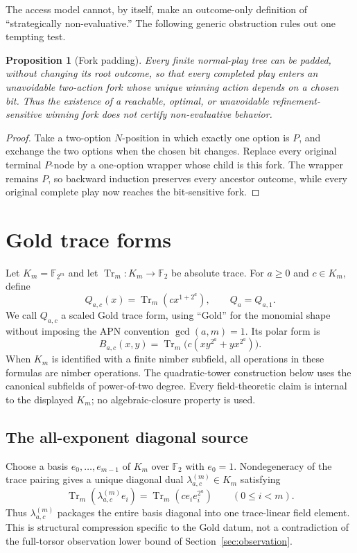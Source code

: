 \documentclass[11pt]{article}
\newtheorem{proposition}[theorem]{Proposition}
\theoremstyle{definition}
\theoremstyle{remark}
\newcommand{\F}{\mathbb{F}}
\newcommand{\Tr}{\operatorname{Tr}}
\begin{document}
The access model cannot, by itself, make an outcome-only definition of
``strategically non-evaluative.''  The following generic obstruction rules
out one tempting test.

\begin{proposition}[Fork padding]\label{prop:fork}
Every finite normal-play tree can be padded, without changing its root
outcome, so that every completed play enters an unavoidable two-action fork
whose unique winning action depends on a chosen bit.  Thus the existence of a
reachable, optimal, or unavoidable refinement-sensitive winning fork does not
certify non-evaluative behavior.
\end{proposition}

\begin{proof}
Take a two-option $N$-position in which exactly one option is $P$, and exchange
the two options when the chosen bit changes.  Replace every original terminal
$P$-node by a one-option wrapper whose child is this fork.  The wrapper remains
$P$, so backward induction preserves every ancestor outcome, while every
original complete play now reaches the bit-sensitive fork.
\end{proof}

\section{Gold trace forms}\label{sec:gold}

Let $K_m=\F_{2^m}$ and let $\Tr_m:K_m\to\F_2$ be absolute trace.  For
$a\ge0$ and $c\in K_m$, define
\[
 Q_{a,c}(x)=\Tr_m(c x^{1+2^a}),
 \qquad Q_a=Q_{a,1}.
\]
We call $Q_{a,c}$ a scaled Gold trace form, using ``Gold'' for the monomial
shape without imposing the APN convention $\gcd(a,m)=1$.
Its polar form is
\[
 B_{a,c}(x,y)=\Tr_m\bigl(c(xy^{2^a}+yx^{2^a})\bigr).
\]
When $K_m$ is identified with a finite nimber subfield, all operations in
these formulas are nimber operations.  The quadratic-tower construction
below uses the canonical subfields of power-of-two degree.  Every
field-theoretic claim is internal to the displayed $K_m$; no
algebraic-closure property is used.

\subsection{The all-exponent diagonal source}

Choose a basis $e_0,\dots,e_{m-1}$ of $K_m$ over $\F_2$ with $e_0=1$.
Nondegeneracy of the trace pairing gives a unique diagonal dual
$\lambda_{a,c}^{(m)}\in K_m$ satisfying
\[
 \Tr_m(\lambda_{a,c}^{(m)}e_i)
 =\Tr_m(c e_i e_i^{2^a})
 \qquad(0\le i<m).
\]
Thus $\lambda_{a,c}^{(m)}$ packages the entire basis diagonal into one
trace-linear field element.  This is structural compression specific to the
Gold datum, not a contradiction of the full-torsor observation lower bound of
Section~\ref{sec:observation}.
\end{document}
